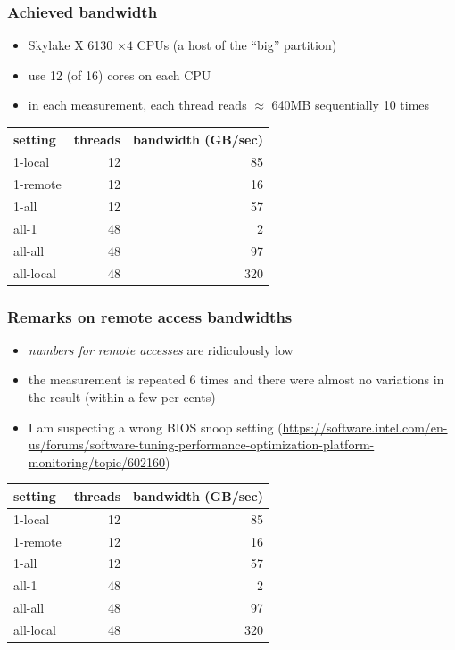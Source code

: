 \documentclass[12pt,dvipdfmx]{beamer}
\newcommand{\ao}[1]{{\color{blue}#1}}
\newcommand{\aka}[1]{{\color{red}#1}}
\begin{document}
\begin{frame}
  \frametitle{Achieved bandwidth}
  \begin{itemize}
  \item Skylake X 6130 $\times 4$ CPUs (a host of the ``big'' partition)
  \item use 12 (of 16) cores on each CPU 
  \item in each measurement,
    each thread reads $\approx$ 640MB sequentially 10 times
  \end{itemize}

  \begin{center}
  \begin{tabular}{|l|r|r|}\hline
    setting   & threads & bandwidth (GB/sec) \\\hline
    1-local   & 12      & 85  \\
    1-remote  & 12      & \aka{16}  \\
    1-all     & 12      & 57  \\
    all-1     & 48      & \aka{2}   \\
    all-all   & 48      & 97  \\
    all-local & 48      & \ao{320} \\\hline
  \end{tabular}
  \end{center}
  
\end{frame}

\begin{frame}
  \frametitle{Remarks on remote access bandwidths}
  \begin{itemize}
  \item \aka{\it numbers for remote accesses} are ridiculously low
  \item the measurement is repeated 6 times and there were almost no
    variations in the result (within a few per cents)
  \item I am suspecting a wrong BIOS snoop setting
    (\url{https://software.intel.com/en-us/forums/software-tuning-performance-optimization-platform-monitoring/topic/602160})
  \end{itemize}

  \begin{center}
  \begin{tabular}{|l|r|r|}\hline
    setting   & threads & bandwidth (GB/sec) \\\hline
    1-local   & 12      & 85  \\
    1-remote  & 12      & \aka{16}  \\
    1-all     & 12      & 57  \\
    all-1     & 48      & \aka{2}   \\
    all-all   & 48      & 97  \\
    all-local & 48      & \ao{320} \\\hline
  \end{tabular}
  \end{center}
  
\end{frame}
\end{document}

